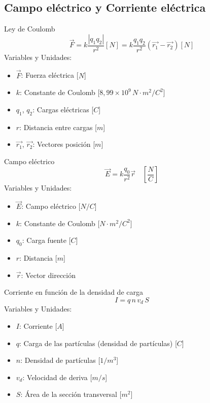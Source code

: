 \begin{landscape}
\section{\textbf{Campo eléctrico y Corriente eléctrica}}

\begin{multicols}{3}

\begin{teorema}{Ley de Coulomb}
    $$\vec{F} = k\frac{|q_1q_2|}{r^2}[N] = k\frac{q_1q_2}{r^2}(\vec{r_1} - \vec{r_2}) [N]$$
    Variables y Unidades:
    \begin{itemize}
        \item $\vec{F}$: Fuerza eléctrica [$N$]
        \item $k$: Constante de Coulomb [$8,99 \times 10^9 \, N\cdot m^2/C^2$]
        \item $q_1$, $q_2$: Cargas eléctricas [$C$]
        \item $r$: Distancia entre cargas [$m$]
        \item $\vec{r_1}$, $\vec{r_2}$: Vectores posición [$m$]
    \end{itemize}
\end{teorema}

\begin{teorema}{Campo eléctrico}
    $$\vec{E} = k\frac{q_0}{r^2}\vec{r}\quad [\frac{N}{C}]$$
    Variables y Unidades:
    \begin{itemize}
        \item $\vec{E}$: Campo eléctrico [$N/C$]
        \item $k$: Constante de Coulomb [$N\cdot m^2/C^2$]
        \item $q_0$: Carga fuente [$C$]
        \item $r$: Distancia [$m$]
        \item $\vec{r}$: Vector dirección
    \end{itemize}
\end{teorema}

\begin{teorema}{Corriente en función de la densidad de carga}
    $$I = q \, n \, v_d \, S$$
    Variables y Unidades:
    \begin{itemize}
        \item $I$: Corriente [$A$]
        \item $q$: Carga de las partículas (densidad de partículas) [$C$]
        \item $n$: Densidad de partículas [$1/m^3$]
        \item $v_d$: Velocidad de deriva [$m/s$]
        \item $S$: Área de la sección transversal [$m^2$]
    \end{itemize}
\end{teorema}


\end{multicols}
\end{landscape}
